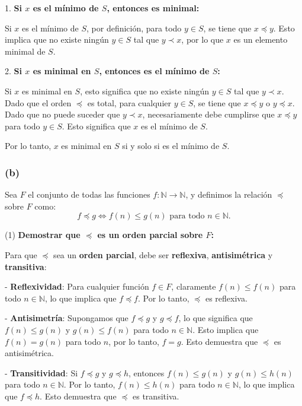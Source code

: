 \documentclass[12pt]{article}
\begin{document}
1. \textbf{Si \(x\) es el mínimo de \(S\), entonces es minimal:}

Si \(x\) es el mínimo de \(S\), por definición, para todo \(y \in S\), se tiene que \(x \preceq y\). Esto implica que no existe ningún \(y \in S\) tal que \(y \prec x\), por lo que \(x\) es un elemento minimal de \(S\).

2. \textbf{Si \(x\) es minimal en \(S\), entonces es el mínimo de \(S\):}

Si \(x\) es minimal en \(S\), esto significa que no existe ningún \(y \in S\) tal que \(y \prec x\). Dado que el orden \(\preceq\) es total, para cualquier \(y \in S\), se tiene que \(x \preceq y\) o \(y \preceq x\). Dado que no puede suceder que \(y \prec x\), necesariamente debe cumplirse que \(x \preceq y\) para todo \(y \in S\). Esto significa que \(x\) es el mínimo de \(S\).

Por lo tanto, \(x\) es minimal en \(S\) si y solo si es el mínimo de \(S\).

\subsubsection*{(b)}

Sea \(F\) el conjunto de todas las funciones \(f : \mathbb{N} \to \mathbb{N}\), y definimos la relación \(\preceq\) sobre \(F\) como:
\[
f \preceq g \iff f(n) \leq g(n) \text{ para todo } n \in \mathbb{N}.
\]

(1) \textbf{Demostrar que \(\preceq\) es un orden parcial sobre \(F\):}

Para que \(\preceq\) sea un \textbf{orden parcial}, debe ser \textbf{reflexiva}, \textbf{antisimétrica} y \textbf{transitiva}:

- \textbf{Reflexividad}: Para cualquier función \(f \in F\), claramente \(f(n) \leq f(n)\) para todo \(n \in \mathbb{N}\), lo que implica que \(f \preceq f\). Por lo tanto, \(\preceq\) es reflexiva.
  
- \textbf{Antisimetría}: Supongamos que \(f \preceq g\) y \(g \preceq f\), lo que significa que \(f(n) \leq g(n)\) y \(g(n) \leq f(n)\) para todo \(n \in \mathbb{N}\). Esto implica que \(f(n) = g(n)\) para todo \(n\), por lo tanto, \(f = g\). Esto demuestra que \(\preceq\) es antisimétrica.
  
- \textbf{Transitividad}: Si \(f \preceq g\) y \(g \preceq h\), entonces \(f(n) \leq g(n)\) y \(g(n) \leq h(n)\) para todo \(n \in \mathbb{N}\). Por lo tanto, \(f(n) \leq h(n)\) para todo \(n \in \mathbb{N}\), lo que implica que \(f \preceq h\). Esto demuestra que \(\preceq\) es transitiva.
\end{document}
